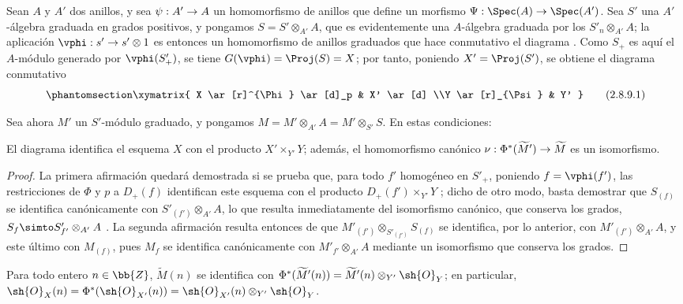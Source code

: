 \documentclass[oneside,10pt]{amsart}
\makeatletter
\newcommand{\ega@arrow}[2]{\mathchoice{#1}{#2}{#2}{#2}}
\renewcommand{\to}{\ega@arrow{\longrightarrow}{\rightarrow}}
\let\EGAOriginalLabel\label
\renewcommand{\label}[1]{\phantomsection\EGAOriginalLabel{#1}}
\makeatother
\begin{document}
\begin{env}[2.8.9]
\label{II.2.8.9}
Sean $A$ y $A'$ dos anillos, y sea $\psi:A'\to A$ un homomorfismo de anillos que define un morfismo $\Psi:\Spec(A)\to\Spec(A')$.
Sea $S'$ una $A'$-álgebra graduada en grados positivos, y pongamos $S=S'\otimes_{A'}A$, que es evidentemente una $A$-álgebra graduada por los $S'_n\otimes_{A'}A$; la aplicación $\vphi:s'\to s'\otimes1$ es entonces un homomorfismo de anillos graduados que hace conmutativo el diagrama .
Como $S_+$ es aquí el $A$-módulo generado por $\vphi(S'_+)$, se tiene $G(\vphi)=\Proj(S)=X$; por tanto, poniendo $X'=\Proj(S')$, se obtiene el diagrama conmutativo
\[
\label{II.2.8.9.1}
  \xymatrix{
    X \ar[r]^{\Phi} \ar[d]_p
    & X' \ar[d]
  \\Y \ar[r]_{\Psi}
    & Y'
  }
\tag{2.8.9.1}
\]

Sea ahora $M'$ un $S'$-módulo graduado, y pongamos $M=M'\otimes_{A'}A=M'\otimes_{S'}S$.
En estas condiciones:
\end{env}

\begin{proposition}[2.8.10]
\label{II.2.8.10}
El diagrama  identifica el esquema $X$ con el producto $X'\times_{Y'}Y$; además, el homomorfismo canónico $\nu:\Phi^*(\widetilde M')\to\widetilde{M}$  es un isomorfismo.
\end{proposition}

\begin{proof}
La primera afirmación quedará demostrada si se prueba que, para todo $f'$ homogéneo en $S'_+$, poniendo $f=\vphi(f')$, las restricciones de $\Phi$ y $p$ a $D_+(f)$ identifican este esquema con el producto $D_+(f')\times_{Y'}Y$ ; dicho de otro modo, basta  demostrar que $S_{(f)}$ se identifica canónicamente con $S'_{(f')}\otimes_{A'}A$, lo que resulta inmediatamente del isomorfismo canónico, que conserva los grados, $S_f\simto S'_{f'}\otimes_{A'}A$ .
La segunda afirmación resulta entonces de que $M'_{(f')}\otimes_{S'_{(f')}}S_{(f)}$ se identifica, por lo anterior, con $M'_{(f')}\otimes_{A'}A$, y este último con $M_{(f)}$, pues $M_f$ se identifica canónicamente con $M'_{f'}\otimes_{A'}A$ mediante un isomorfismo que conserva los grados.
\end{proof}

\begin{corollary}[2.8.11]
\label{II.2.8.11}
Para todo entero $n\in\bb{Z}$, $\widetilde{M}(n)$ se identifica con $\Phi^*(\widetilde M'(n))=\widetilde M'(n)\otimes_{Y'}\sh{O}_Y$; en particular, $\sh{O}_X(n)=\Phi^*(\sh{O}_{X'}(n))=\sh{O}_{X'}(n)\otimes_{Y'}\sh{O}_Y$.
\end{corollary}
\end{document}
